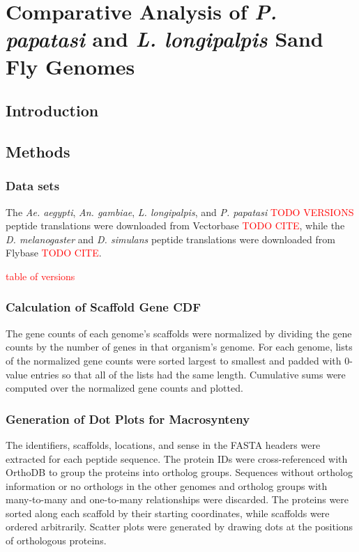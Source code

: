 \chapter{Comparative Analysis of \emph{P. papatasi} and \emph{L. longipalpis} Sand Fly Genomes}

\section{Introduction}

\section{Methods}

\subsection{Data sets}


The \emph{Ae. aegypti}, \emph{An. gambiae}, \emph{L. longipalpis}, and \emph{P. papatasi} \textcolor{red}{TODO VERSIONS} peptide translations were downloaded from Vectorbase \textcolor{red}{TODO CITE}, while the \emph{D. melanogaster} and \emph{D. simulans} peptide translations were downloaded from Flybase \textcolor{red}{TODO CITE}.

\textcolor{red}{table of versions}


\subsection{Calculation of Scaffold Gene CDF}
The gene counts of each genome's scaffolds were normalized by dividing the gene counts by the number of genes in that organism's genome. For each genome, lists of the normalized gene counts were sorted largest to smallest and padded with 0-value entries so that all of the lists had the same length.  Cumulative sums were computed over the normalized gene counts and plotted.


\subsection{Generation of Dot Plots for Macrosynteny} \label{sec:synteny-methods-dotplots}
The identifiers, scaffolds, locations, and sense in the FASTA headers were extracted for each peptide sequence.  The protein IDs were cross-referenced with OrthoDB to group the proteins into ortholog groups.  Sequences without ortholog information or no orthologs in the other genomes and ortholog groups with many-to-many and one-to-many relationships were discarded.  The proteins were sorted along each scaffold by their starting coordinates, while scaffolds were ordered arbitrarily.  Scatter plots were generated by drawing dots at the positions of orthologous proteins.

